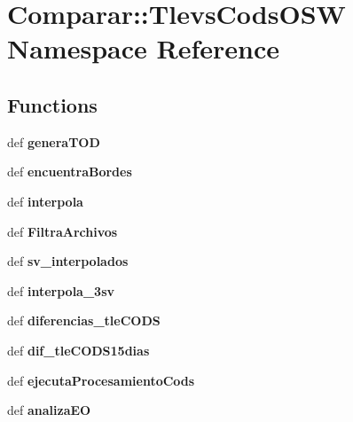 \section{\-Comparar\-:\-:\-Tlevs\-Cods\-O\-S\-W \-Namespace \-Reference}
\label{namespace_comparar_1_1_tlevs_cods_o_s_w}
\subsection*{\-Functions}
\begin{DoxyCompactItemize}
\item 
def {\bf genera\-T\-O\-D}
\item 
def {\bf encuentra\-Bordes}
\item 
def {\bf interpola}
\item 
def {\bf \-Filtra\-Archivos}
\item 
def {\bf sv\-\_\-interpolados}
\item 
def {\bf interpola\-\_\-3sv}
\item 
def {\bf diferencias\-\_\-tle\-C\-O\-D\-S}
\item 
def {\bf dif\-\_\-tle\-C\-O\-D\-S15dias}
\item 
def {\bf ejecuta\-Procesamiento\-Cods}
\item 
def {\bf analiza\-E\-O}
\end{DoxyCompactItemize}
